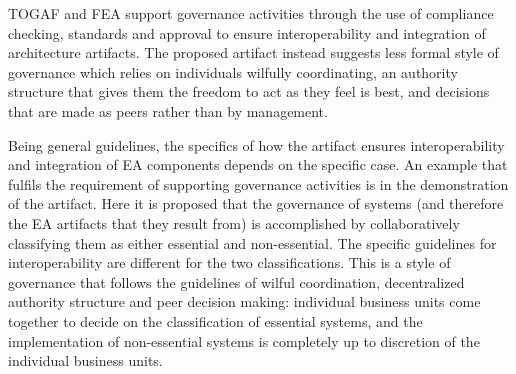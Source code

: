 TOGAF and FEA support governance activities through the use of compliance checking, standards and approval to ensure interoperability and integration of architecture artifacts. The proposed artifact instead suggests less formal style of governance which relies on individuals wilfully coordinating, an authority structure that gives them the freedom to act as they feel is best, and decisions that are made as peers rather than by management.

Being general guidelines, the specifics of how the artifact ensures interoperability and integration of EA components depends on the specific case. An example that fulfils the requirement of supporting governance activities is in the demonstration of the artifact. Here it is proposed that the governance of systems (and therefore the EA artifacts that they result from) is accomplished by collaboratively classifying them as either essential and non-essential. The specific guidelines for interoperability are different for the two classifications. This is a style of governance that follows the guidelines of wilful coordination, decentralized authority structure and peer decision making: individual business units come together to decide on the classification of essential systems, and the implementation of non-essential systems is completely up to discretion of the individual business units. 
